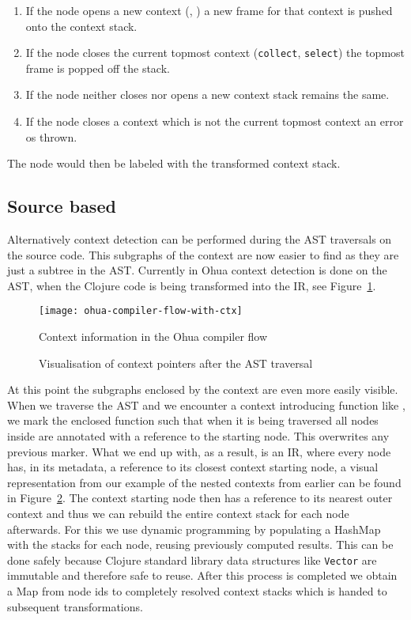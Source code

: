 \begin{enumerate}
  \item If the node opens a new context (\smap{}, \ifop{}) a new frame for that context is pushed onto the context stack.
  \item If the node closes the current topmost context (\texttt{collect}, \texttt{select}) the topmost frame is popped off the stack.
  \item If the node neither closes nor opens a new context stack remains the same.
  \item If the node closes a context which is not the current topmost context an error os thrown.
\end{enumerate}

The node would then be labeled with the transformed context stack.

\subsection{Source based}

Alternatively context detection can be performed during the AST traversals on the source code.
This subgraphs of the context are now easier to find as they are just a subtree in the AST.
Currently in Ohua context detection is done on the AST, when the Clojure code is being transformed into the IR, see Figure~\ref{fig:ohua-compiler-flow-with-ctx}.

\begin{figure}
  \texttt{[image: ohua-compiler-flow-with-ctx]}
  \caption{Context information in the Ohua compiler flow}
  \label{fig:ohua-compiler-flow-with-ctx}
\end{figure}

\begin{figure}
  \caption{Visualisation of context pointers after the AST traversal}
  \label{fig:context-pointers}
\end{figure}

At this point the subgraphs enclosed by the context are even more easily visible.
When we traverse the AST and we encounter a context introducing function like \smap{}, we mark the enclosed function such that when it is being traversed all nodes inside are annotated with a reference to the \smap{} starting node.
This overwrites any previous marker.
What we end up with, as a result, is an IR, where every node has, in its metadata, a reference to its closest context starting node, a visual representation from our example of the nested contexts from earlier can be found in Figure~\ref{fig:context-pointers}.
The context starting node then has a reference to its nearest outer context and thus we can rebuild the entire context stack for each node afterwards.
For this we use dynamic programming by populating a HashMap with the stacks for each node, reusing previously computed results.
This can be done safely because Clojure standard library data structures like \texttt{Vector} are immutable and therefore safe to reuse.
After this process is completed we obtain a Map from node ids to completely resolved context stacks which is handed to subsequent transformations.

